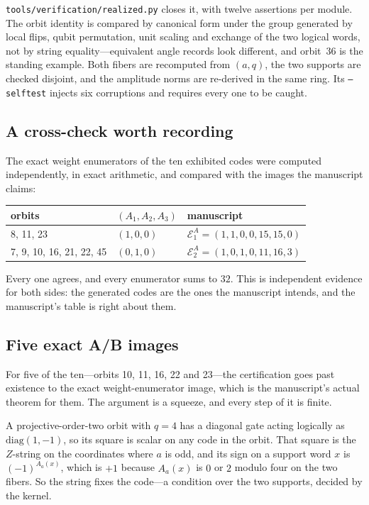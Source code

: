 \documentclass[11pt,a4paper]{article}
\newcommand{\lean}[1]{\texttt{#1}}
\theoremstyle{definition}
\begin{document}
\lean{tools/verification/realized.py} closes it, with twelve assertions per
module. The orbit identity is compared by canonical form under the group
generated by local flips, qubit permutation, unit scaling and exchange of the
two logical words, not by string equality---equivalent angle records look
different, and orbit~36 is the standing example. Both fibers are recomputed
from $(a,q)$, the two supports are checked disjoint, and the amplitude norms
are re-derived in the same ring. Its \lean{--selftest} injects six corruptions
and requires every one to be caught.

\subsection{A cross-check worth recording}

The exact weight enumerators of the ten exhibited codes were computed
independently, in exact arithmetic, and compared with the images the manuscript
claims:

\begin{center}
\begin{tabular}{lll}
\toprule
orbits & $(A_1,A_2,A_3)$ & manuscript \\
\midrule
8, 11, 23 & $(1,0,0)$ & $\mathcal E_1^A=(1,1,0,0,15,15,0)$ \\
7, 9, 10, 16, 21, 22, 45 & $(0,1,0)$ & $\mathcal E_2^A=(1,0,1,0,11,16,3)$ \\
\bottomrule
\end{tabular}
\end{center}

Every one agrees, and every enumerator sums to $32$. This is independent
evidence for both sides: the generated codes are the ones the manuscript
intends, and the manuscript's table is right about them.

\subsection{Five exact A/B images}

For five of the ten---orbits 10, 11, 16, 22 and 23---the certification goes past
existence to the exact weight-enumerator image, which is the manuscript's actual
theorem for them. The argument is a squeeze, and every step of it is finite.

A projective-order-two orbit with $q=4$ has a diagonal gate acting logically as
$\mathrm{diag}(1,-1)$, so its square is scalar on any code in the orbit. That
square is the $Z$-string on the coordinates where $a$ is odd, and its sign on a
support word $x$ is $(-1)^{A_a(x)}$, which is $+1$ because $A_a(x)$ is $0$ or
$2$ modulo four on the two fibers. So the string fixes the code---a condition
over the two supports, decided by the kernel.
\end{document}
